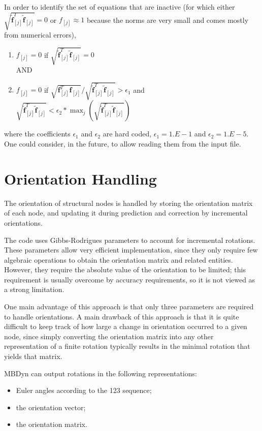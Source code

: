 \documentclass[10pt,fleqn,subeqn]{report}
\newcommand{\T}[1]{\bm{#1}}
\begin{document}
In order to identify the set of equations that are inactive (for which either 
$\sqrt{\tilde{\T{f}}_{[j]}^T\tilde{\T{f}}_{[j]}}=0$ or $f_{[j]}\approx 1$ because
the norms are very small and comes mostly from numerical errors),
\begin{enumerate}
\item $f_{[j]}=0$ if $\sqrt{\tilde{\T{f}}_{[j]}^T\tilde{\T{f}}_{[j]}}=0$\\
AND
\item $f_{[j]}=0$ if $\sqrt{\T{f}_{[j]}^T\T{f}_{[j]}}/\sqrt{\tilde{\T{f}}_{[j]}^T\tilde{\T{f}}_{[j]}} >
\epsilon_1$ and $\sqrt{\tilde{\T{f}}_{[j]}^T\tilde{\T{f}}_{[j]}} < \epsilon_2 *
\max_j\left(\sqrt{\tilde{\T{f}}_{[j]}^T\tilde{\T{f}}_{[j]}}\right)$
\end{enumerate}
where the coefficients $\epsilon_1$ and $\epsilon_2$ are hard coded, $\epsilon_1=1.E-1$ and $\epsilon_2=1.E-5$.
One could consider, in the future, to allow reading them from the input file.
\chapter{Orientation Handling}
The orientation of structural nodes is handled by storing the orientation
matrix of each node, and updating it during prediction and correction 
by incremental orientations.

The code uses Gibbs-Rodrigues parameters to account for incremental 
rotations.
These parameters allow very efficient implementation, since they
only require few algebraic operations to obtain the orientation matrix
and related entities.
However, they require the absolute value of the orientation to be limited;
this requirement is usually overcome by accuracy requirements,
so it is not viewed as a strong limitation.

One main advantage of this approach is that only three parameters
are required to handle orientations.
A main drawback of this approach is that it is quite difficult
to keep track of how large a change in orientation occurred
to a given node, since simply converting the orientation matrix 
into any other representation of a finite rotation typically results
in the minimal rotation that yields that matrix.

MBDyn can output rotations in the following representations:
\begin{itemize}
\item Euler angles according to the 123 sequence;
\item the orientation vector;
\item the orientation matrix.
\end{itemize}
\end{document}
